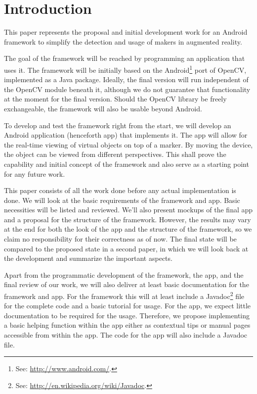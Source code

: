 \section{Introduction}

This paper represents the proposal and initial development work for an Android framework to simplify the detection and usage of makers in augmented reality.

The goal of the framework will be reached by programming an application that uses it.
The framework will be initially based on the Android\footnote{See: \url{http://www.android.com/}.} port\cite{opencvandroid} of OpenCV\cite{opencv}, implemented as a Java package.
Ideally, the final version will run independent of the OpenCV module beneath it, although we do not guarantee that functionality at the moment for the final version.
Should the OpenCV library be freely exchangeable, the framework will also be usable beyond Android.

To develop and test the framework right from the start, we will develop an Android application (henceforth app) that implements it.
The app will allow for the real-time viewing of virtual objects on top of a marker.
By moving the device, the object can be viewed from different perspectives.
This shall prove the capability and initial concept of the framework and also serve as a starting point for any future work.

This paper consists of all the work done before any actual implementation is done.
We will look at the basic requirements of the framework and app.
Basic necessities will be listed and reviewed.
We'll also present mockups of the final app and a proposal for the structure of the framework.
However, the results may vary at the end for both the look of the app and the structure of the framework, so we claim no responsibility for their correctness as of now.
The final state will be compared to the proposed state in a second paper, in which we will look back at the development and summarize the important aspects.

Apart from the programmatic development of the framework, the app, and the final review of our work, we will also deliver at least basic documentation for the framework and app.
For the framework this will at least include a Javadoc\footnote{See: \url{http://en.wikipedia.org/wiki/Javadoc}.} file for the complete code and a basic tutorial for usage.
For the app, we expect little documentation to be required for the usage.
Therefore, we propose implementing a basic helping function within the app either as contextual tips or manual pages accessible from within the app.
The code for the app will also include a Javadoc file.

